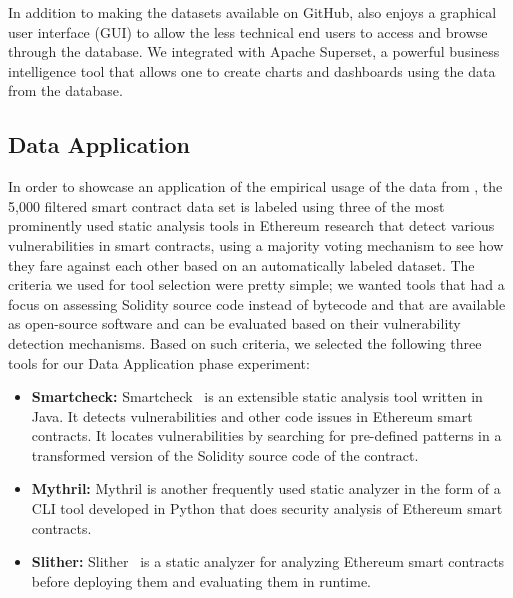     In addition to making the datasets available on GitHub, \etherbase also enjoys a graphical user interface (GUI) to allow the less technical end users to access and browse through the database.
    We integrated \etherbase with Apache Superset, a powerful business intelligence tool that allows one to create charts and dashboards using the data from the database.

\subsection{Data Application}
    In order to showcase an application of the empirical usage of the data from \etherbase, 
    the 5,000 filtered smart contract data set is labeled using three of the most prominently used static analysis tools in Ethereum research that detect
    various vulnerabilities in smart contracts, using a majority voting mechanism to see how they fare against each other based on an automatically labeled dataset.
    The criteria we used for tool selection were pretty simple; we wanted tools that had a focus on assessing Solidity source code instead of bytecode and that are available as open-source software and can be evaluated based on their vulnerability detection mechanisms.
    Based on such criteria, we selected the following three tools for our Data Application phase experiment:
    \begin{itemize}
        \item \textbf{Smartcheck:} Smartcheck~\cite{smartcheck} is an extensible static analysis tool written in Java. It detects vulnerabilities and other code issues in Ethereum smart contracts. It locates vulnerabilities by searching for pre-defined patterns in a transformed version of the Solidity source code of the contract.
        \item \textbf{Mythril:} Mythril is another frequently used static analyzer in the form of a CLI tool developed in Python that does security analysis of Ethereum smart contracts.
        \item \textbf{Slither:} Slither~\cite{slither} is a static analyzer for analyzing Ethereum smart contracts before deploying them and evaluating them in runtime.
    \end{itemize}
    
